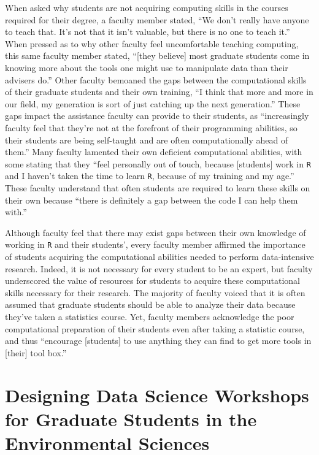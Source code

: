 \documentclass[12pt]{article}
\begin{document}
\quad When asked why students are not acquiring computing skills in the courses
required for their degree, a faculty member stated, ``We don't really have
anyone to teach that. It's not that it isn't valuable, but there is no one to
teach it.'' When pressed as to why other faculty feel uncomfortable teaching
computing, this same faculty member stated, ``[they believe] most graduate
students come in knowing more about the tools one might use to manipulate data
than their advisers do.'' Other faculty bemoaned the gaps between the
computational skills of their graduate students and their own training, 
``I think that more and more in our field, my generation is sort of just 
catching up the next generation.'' These gaps impact the assistance faculty can
provide to their students, as ``increasingly faculty feel that they're not at 
the forefront of their programming abilities, so their students are being 
self-taught and are often computationally ahead of them.'' Many faculty 
lamented their own deficient computational abilities, with some stating that 
they ``feel personally out of touch, because [students] work in \texttt{R} and 
I haven't taken the time to learn \texttt{R}, because of my training and my
age.'' These faculty understand that often students are required to learn these
skills on their own because ``there is definitely a gap between the code I can
help them with.''  

\quad Although faculty feel that there may exist gaps between their own
knowledge of working in \texttt{R} and their students', every faculty member
affirmed the importance of students acquiring the computational abilities needed
to perform data-intensive research. Indeed, it is not necessary for every
student to be an expert, but faculty underscored the value of resources for
students to acquire these computational skills necessary for their research. The
majority of faculty voiced that it is often assumed that graduate students
should be able to analyze their data because they've taken a statistics course.
Yet, faculty members acknowledge the poor computational preparation of their
students even after taking a statistic course, and thus ``encourage [students]
to use anything they can find to get more tools in [their] tool box.'' 

\section{Designing Data Science Workshops for Graduate Students in the 
Environmental Sciences}
\label{secion:workshops}
\end{document}
